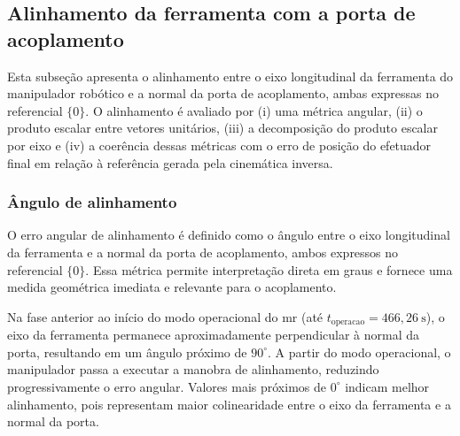 
\subsection{Alinhamento da ferramenta com a porta de acoplamento}
\label{subsec_cap4_alinhamento}

Esta subseção apresenta o alinhamento entre o eixo longitudinal da ferramenta do manipulador robótico e a normal da porta de acoplamento, ambas expressas no referencial $\{0\}$.
O alinhamento é avaliado por
(i) uma métrica angular,
(ii) o produto escalar entre vetores unitários,
(iii) a decomposição do produto escalar por eixo e
(iv) a coerência dessas métricas com o erro de posição do efetuador final em relação à referência gerada pela cinemática inversa.



\subsubsection{Ângulo de alinhamento}
\label{subsubsec_cap4_alinhamento_angulo}

O erro angular de alinhamento é definido como o ângulo entre o eixo longitudinal da ferramenta e a normal da porta de acoplamento, ambos expressos no referencial $\{0\}$.
Essa métrica permite interpretação direta em graus e fornece uma medida geométrica imediata e relevante para o acoplamento.

Na fase anterior ao início do modo operacional do \gls{mr} (até $t_\text{operacao}=466{,}26~\mathrm{s}$), o eixo da ferramenta permanece aproximadamente perpendicular à normal da porta, resultando em um ângulo próximo de $90^\circ$.
A partir do modo operacional, o manipulador passa a executar a manobra de alinhamento, reduzindo progressivamente o erro angular.
Valores mais próximos de $0^\circ$ indicam melhor alinhamento, pois representam maior colinearidade entre o eixo da ferramenta e a normal da porta.

